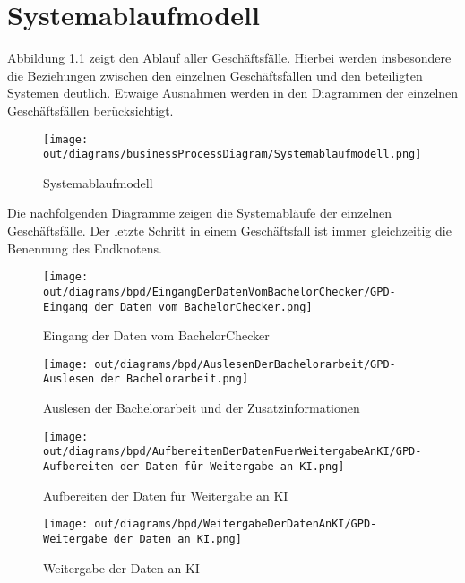 \chapter{Systemablaufmodell}\label{ch:systemablaufmodell}

Abbildung \ref{fig:systemablaufmodell} zeigt den Ablauf aller Geschäftsfälle.
Hierbei werden insbesondere die Beziehungen zwischen den einzelnen Geschäftsfällen und den beteiligten Systemen deutlich.
Etwaige Ausnahmen werden in den Diagrammen der einzelnen Geschäftsfällen berücksichtigt.

\begin{figure}[H]
    \centering
    \texttt{[image: out/diagrams/businessProcessDiagram/Systemablaufmodell.png]}
    \caption{Systemablaufmodell}
    \label{fig:systemablaufmodell}
\end{figure}

\newpage Die nachfolgenden Diagramme zeigen die Systemabläufe der einzelnen Geschäftsfälle.
Der letzte Schritt in einem Geschäftsfall ist immer gleichzeitig die Benennung des Endknotens.

\begin{figure}[H]
    \centering
    \texttt{[image: out/diagrams/bpd/EingangDerDatenVomBachelorChecker/GPD-Eingang der Daten vom BachelorChecker.png]}
    \caption{Eingang der Daten vom BachelorChecker}
    \label{fig:eingangDerDatenVomBachelorChecker}
\end{figure}

\begin{figure}[H]
    \centering
    \texttt{[image: out/diagrams/bpd/AuslesenDerBachelorarbeit/GPD-Auslesen der Bachelorarbeit.png]}
    \caption{Auslesen der Bachelorarbeit und der Zusatzinformationen}
    \label{fig:auslesenDerBachelorarbeit}
\end{figure}

\begin{figure}[H]
    \centering
    \texttt{[image: out/diagrams/bpd/AufbereitenDerDatenFuerWeitergabeAnKI/GPD-Aufbereiten der Daten für Weitergabe an KI.png]}
    \caption{Aufbereiten der Daten für Weitergabe an KI}
    \label{fig:aufbereitenDerDatenFuerWeitergabeAnKI}
\end{figure}

\begin{figure}[H]
    \centering
    \texttt{[image: out/diagrams/bpd/WeitergabeDerDatenAnKI/GPD-Weitergabe der Daten an KI.png]}
    \caption{Weitergabe der Daten an KI}
    \label{fig:weitergabeDerDatenAnKI}
\end{figure}

